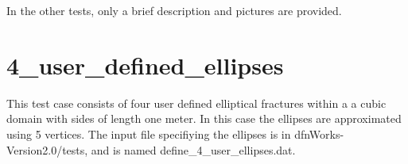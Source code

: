 \documentclass[letterpaper,10pt,english]{sphinxmanual}
\begin{document}
In the other tests, only a brief description and pictures are provided.


\section{4\_user\_defined\_ellipses}
\label{tutorial:user-defined-ellipses}
This test case consists of four user defined elliptical fractures within a a cubic domain with sides of length one meter. In this case the ellipses are approximated using 5 vertices. The input file specifiying the ellipses is in dfnWorks-Version2.0/tests, and is named define\_4\_user\_ellipses.dat.

{\hfill{}\hfill}

\begin{DUlineblock}{0em}
\item[] 
\item[] 
\end{DUlineblock}

{\hfill{}\hfill}

\begin{DUlineblock}{0em}
\item[] 
\item[] 
\end{DUlineblock}
\end{document}
